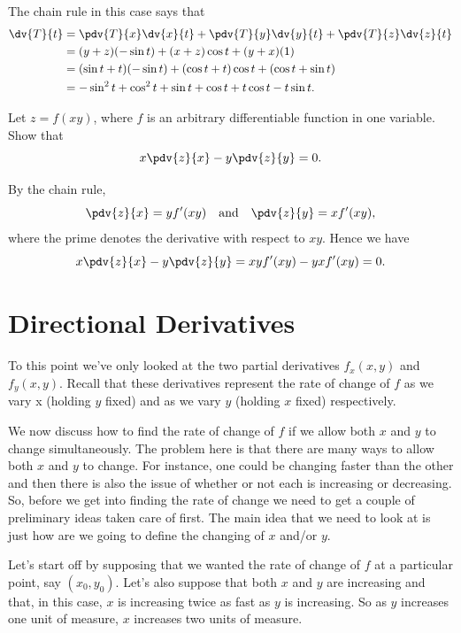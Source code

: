 \begin{solution}
The chain rule in this case says that
\begin{align*}
\dv{T}{t} &= \pdv{T}{x}\dv{x}{t}+\pdv{T}{y}\dv{y}{t}+\pdv{T}{z}\dv{z}{t} \\
&= (y+z)(-\sin t)+(x+z)\cos t+(y+x)(1) \\
&= (\sin t+t)(-\sin t)+(\cos t+t)\cos t+(\cos t+\sin t) \\
&= -\sin^2t+\cos^2t+\sin t+\cos t+t\cos t-t\sin t.
\end{align*}
\end{solution}

\begin{exercise}
Let $z=f(xy)$, where $f$ is an arbitrary differentiable function in one variable. Show that
\[ x\pdv{z}{x}-y\pdv{z}{y}=0. \]
\end{exercise}

\begin{solution}
By the chain rule,
\[ \pdv{z}{x}=yf^\prime(xy) \quad \text{and} \quad \pdv{z}{y}=xf^\prime(xy), \]
where the prime denotes the derivative with respect to $xy$. Hence we have
\[ x\pdv{z}{x}-y\pdv{z}{y}=xyf^\prime(xy)-yxf^\prime(xy)=0. \]
\end{solution}

\section{Directional Derivatives}
To this point we've only looked at the two partial derivatives $f_x(x,y)$ and $f_y(x,y)$. Recall that these derivatives represent the rate of change of $f$ as we vary x (holding $y$ fixed) and as we vary $y$ (holding $x$ fixed) respectively. 

We now discuss how to find the rate of change of $f$ if we allow both $x$ and $y$ to change simultaneously. The problem here is that there are many ways to allow both $x$ and $y$ to change. For instance, one could be changing faster than the other and then there is also the issue of whether or not each is increasing or decreasing. So, before we get into finding the rate of change we need to get a couple of preliminary ideas taken care of first. The main idea that we need to look at is just how are we going to define the changing of $x$ and/or $y$.

Let's start off by supposing that we wanted the rate of change of $f$ at a particular point, say $(x_0,y_0)$. Let's also suppose that both $x$ and $y$ are increasing and that, in this case, $x$ is increasing twice as fast as $y$ is increasing. So as $y$ increases one unit of measure, $x$ increases two units of measure.

